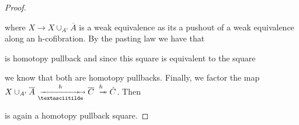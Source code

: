 \begin{prop}
\begin{proof}
\begin{center}
        \end{center}
        where $X\to X\cup_{A'}\overline{A}$ is a weak equivalence as its a pushout of a weak equivalence along an h-cofibration. %
        By the pasting law we have that
        \begin{center}
        \end{center}
        is homotopy pullback and since this square is equivalent %
        to the square
        \begin{center}
        \end{center}
        we know that both are homotopy pullbacks.
        Finally, we factor the map $X\cup_{A'}\overline{A}\xtailrightarrow[\textasciitilde]{h}\overline{C}\xtwoheadrightarrow{h}\hat{C}$.
        Then 
        \begin{center}
        \end{center}
        is again a homotopy pullback square. %


\end{proof}
\end{prop}
